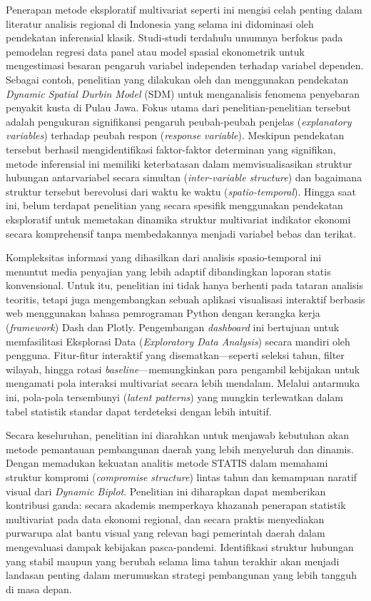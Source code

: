 \documentclass[a4paper]{article}
\theoremstyle{definition} %
\begin{document}
Penerapan metode eksploratif multivariat seperti ini mengisi celah penting dalam literatur analisis regional di Indonesia yang selama ini didominasi oleh pendekatan inferensial klasik. Studi-studi terdahulu umumnya berfokus pada pemodelan regresi data panel atau model spasial ekonometrik untuk mengestimasi besaran pengaruh variabel independen terhadap variabel dependen. Sebagai contoh, penelitian yang dilakukan oleh \citep{nuswantari2021} dan \citep{ahmad2024} menggunakan pendekatan \textit{Dynamic Spatial Durbin Model} (SDM) untuk menganalisis fenomena penyebaran penyakit kusta di Pulau Jawa. Fokus utama dari penelitian-penelitian tersebut adalah pengukuran signifikansi pengaruh peubah-peubah penjelas (\textit{explanatory variables}) terhadap peubah respon (\textit{response variable}). Meskipun pendekatan tersebut berhasil mengidentifikasi faktor-faktor determinan yang signifikan, metode inferensial ini memiliki keterbatasan dalam memvisualisasikan struktur hubungan antarvariabel secara simultan (\textit{inter-variable structure}) dan bagaimana struktur tersebut berevolusi dari waktu ke waktu (\textit{spatio-temporal}). Hingga saat ini, belum terdapat penelitian yang secara spesifik menggunakan pendekatan eksploratif untuk memetakan dinamika struktur multivariat indikator ekonomi secara komprehensif tanpa membedakannya menjadi variabel bebas dan terikat.

Kompleksitas informasi yang dihasilkan dari analisis spasio-temporal ini menuntut media penyajian yang lebih adaptif dibandingkan laporan statis konvensional. Untuk itu, penelitian ini tidak hanya berhenti pada tataran analisis teoritis, tetapi juga mengembangkan sebuah aplikasi visualisasi interaktif berbasis web menggunakan bahasa pemrograman Python dengan kerangka kerja (\textit{framework}) Dash dan Plotly. Pengembangan \textit{dashboard} ini bertujuan untuk memfasilitasi Eksplorasi Data (\textit{Exploratory Data Analysis}) secara mandiri oleh pengguna. Fitur-fitur interaktif yang disematkan---seperti seleksi tahun, filter wilayah, hingga rotasi \textit{baseline}---memungkinkan para pengambil kebijakan untuk mengamati pola interaksi multivariat secara lebih mendalam. Melalui antarmuka ini, pola-pola tersembunyi (\textit{latent patterns}) yang mungkin terlewatkan dalam tabel statistik standar dapat terdeteksi dengan lebih intuitif.

Secara keseluruhan, penelitian ini diarahkan untuk menjawab kebutuhan akan metode pemantauan pembangunan daerah yang lebih menyeluruh dan dinamis. Dengan memadukan kekuatan analitis metode STATIS dalam memahami struktur kompromi (\textit{compromise structure}) lintas tahun dan kemampuan naratif visual dari \textit{Dynamic Biplot}. Penelitian ini diharapkan dapat memberikan kontribusi ganda: secara akademis memperkaya khazanah penerapan statistik multivariat pada data ekonomi regional, dan secara praktis menyediakan purwarupa alat bantu visual yang relevan bagi pemerintah daerah dalam mengevaluasi dampak kebijakan pasca-pandemi. Identifikasi struktur hubungan yang stabil maupun yang berubah selama lima tahun terakhir akan menjadi landasan penting dalam merumuskan strategi pembangunan yang lebih tangguh di masa depan.
\end{document}
